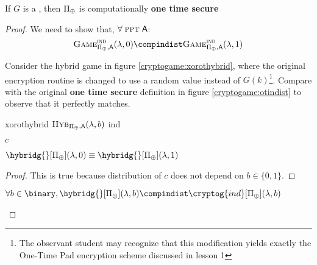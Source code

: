 \begin{theorem}
    If $G$ is a \prg, then $\Pi_{\oplus}$ is computationally \textbf{one time secure}
\end{theorem}

\begin{proof}
    We need to show that, $\forall\; \textsc{ppt}\; \textsf{A}$:
    \[
        \textsc{Game}_{\Pi_{\xor}, \textsf{A}}^{\textsc{ind}}(\lambda, 0) \compindist \textsc{Game}_{\Pi_{\xor}, \textsf{A}}^{\textsc{ind}}(\lambda, 1)
    \]

    Consider the hybrid game in figure \ref{cryptogame:xorothybrid}, where the original encryption routine is changed to use a random value instead of $G(k)$\footnote{The observant student may recognize that this modification yields exactly the One-Time Pad encryption scheme discussed in lesson 1}. Compare with the original \textbf{one time secure} definition in figure \ref{cryptogame:otindist} to observe that it perfectly matches.

    \begin{cryptogame}
        {xorothybrid}
        {$\textsc{Hyb}_{\Pi_{\oplus}, \textsf{A}}(\lambda, b)$}
        {ind}


        {$c$}{}

        \cseqdelay

        
    \end{cryptogame}

    \begin{lemma}
        $\hybridg{}[\Pi_{\xor}](\lambda, 0) \equiv \hybridg{}[\Pi_{\xor}](\lambda, 1)$
    \end{lemma}

    \begin{proof}
    This is true because distribution of $c$ does not depend on $b \in \{0, 1\}$.
    \end{proof}

    \begin{lemma}
        $\forall b \in \binary, \hybridg{}[\Pi_{\xor}](\lambda, b) \compindist \cryptog{ind}[\Pi_{\xor}](\lambda, b)$
    \end{lemma}


\end{proof}

